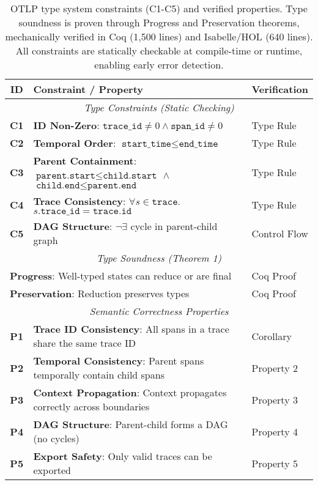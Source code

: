 
\begin{table}[t]
\centering
\caption{OTLP type system constraints (C1-C5) and verified properties. Type soundness is proven through Progress and Preservation theorems, mechanically verified in Coq (1,500 lines) and Isabelle/HOL (640 lines). All constraints are statically checkable at compile-time or runtime, enabling early error detection.}
\label{tab:type-system}
\small
\begin{tabular}{|c|p{4.5cm}|p{2cm}|}
\hline
\textbf{ID} & \textbf{Constraint / Property} & \textbf{Verification} \\
\hline
\hline
\multicolumn{3}{|c|}{\textit{Type Constraints (Static Checking)}} \\
\hline
\textbf{C1} & \textbf{ID Non-Zero}: $\texttt{trace\_id} \neq 0 \land \texttt{span\_id} \neq 0$ & Type Rule \\
\hline
\textbf{C2} & \textbf{Temporal Order}: $\texttt{start\_time} \leq \texttt{end\_time}$ & Type Rule \\
\hline
\textbf{C3} & \textbf{Parent Containment}: $\texttt{parent.start} \leq \texttt{child.start}$ $\land$ $\texttt{child.end} \leq \texttt{parent.end}$ & Type Rule \\
\hline
\textbf{C4} & \textbf{Trace Consistency}: $\forall s \in \texttt{trace}.$ $s.\texttt{trace\_id} = \texttt{trace}.\texttt{id}$ & Type Rule \\
\hline
\textbf{C5} & \textbf{DAG Structure}: $\neg\exists$ cycle in parent-child graph & Control Flow \\
\hline
\hline
\multicolumn{3}{|c|}{\textit{Type Soundness (Theorem 1)}} \\
\hline
\multicolumn{2}{|l|}{\textbf{Progress}: Well-typed states can reduce or are final} & Coq Proof \\
\multicolumn{2}{|l|}{\textbf{Preservation}: Reduction preserves types} & Coq Proof \\
\hline
\hline
\multicolumn{3}{|c|}{\textit{Semantic Correctness Properties}} \\
\hline
\textbf{P1} & \textbf{Trace ID Consistency}: All spans in a trace share the same trace ID & Corollary \\
\hline
\textbf{P2} & \textbf{Temporal Consistency}: Parent spans temporally contain child spans & Property 2 \\
\hline
\textbf{P3} & \textbf{Context Propagation}: Context propagates correctly across boundaries & Property 3 \\
\hline
\textbf{P4} & \textbf{DAG Structure}: Parent-child forms a DAG (no cycles) & Property 4 \\
\hline
\textbf{P5} & \textbf{Export Safety}: Only valid traces can be exported & Property 5 \\
\hline
\end{tabular}


\end{table}
